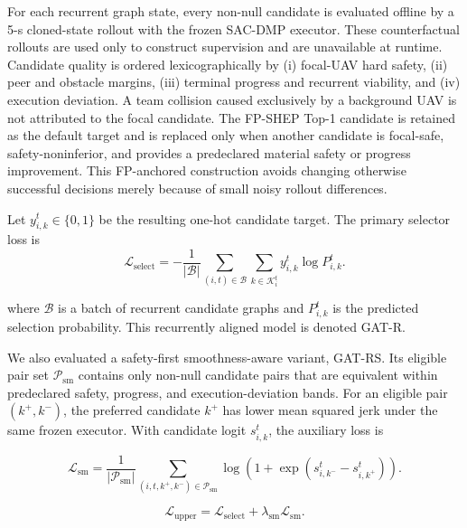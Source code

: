 For each recurrent graph state, every non-null candidate is evaluated offline by a 5-s cloned-state rollout with the frozen SAC-DMP executor. These counterfactual rollouts are used only to construct supervision and are unavailable at runtime. Candidate quality is ordered lexicographically by (i) focal-UAV hard safety, (ii) peer and obstacle margins, (iii) terminal progress and recurrent viability, and (iv) execution deviation. A team collision caused exclusively by a background UAV is not attributed to the focal candidate. The FP-SHEP Top-1 candidate is retained as the default target and is replaced only when another candidate is focal-safe, safety-noninferior, and provides a predeclared material safety or progress improvement. This FP-anchored construction avoids changing otherwise successful decisions merely because of small noisy rollout differences.

Let $y_{i,k}^{t}\in\{0,1\}$ be the resulting one-hot candidate target. The primary selector loss is
\begin{equation}
    \label{eq:candidate_selection_loss}
    \mathcal L_{\mathrm{select}}
    =
    -
    \frac{1}{|\mathcal B|}
    \sum_{(i,t)\in\mathcal B}
    \sum_{k\in\mathcal K_i^t}
    y_{i,k}^{t}
    \log P_{i,k}^{t}.
\end{equation}

\noindent
where $\mathcal B$ is a batch of recurrent candidate graphs and $P_{i,k}^{t}$ is the predicted selection probability. This recurrently aligned model is denoted GAT-R.

We also evaluated a safety-first smoothness-aware variant, GAT-RS. Its eligible pair set $\mathcal P_{\mathrm{sm}}$ contains only non-null candidate pairs that are equivalent within predeclared safety, progress, and execution-deviation bands. For an eligible pair $(k^{+},k^{-})$, the preferred candidate $k^{+}$ has lower mean squared jerk under the same frozen executor. With candidate logit $s_{i,k}^{t}$, the auxiliary loss is

\begin{equation}
    \label{eq:smoothness_pairwise_loss}
    \mathcal L_{\mathrm{sm}}
    =
    \frac{1}{|\mathcal P_{\mathrm{sm}}|}
    \sum_{(i,t,k^{+},k^{-})\in\mathcal P_{\mathrm{sm}}}
    \log\!\left(1+\exp\left(s_{i,k^{-}}^{t}-s_{i,k^{+}}^{t}\right)\right).
\end{equation}

\begin{equation}
    \label{eq:upper_selection_loss}
    \mathcal L_{\mathrm{upper}}
    =
    \mathcal L_{\mathrm{select}}
    +
    \lambda_{\mathrm{sm}}
    \mathcal L_{\mathrm{sm}}.
\end{equation}


